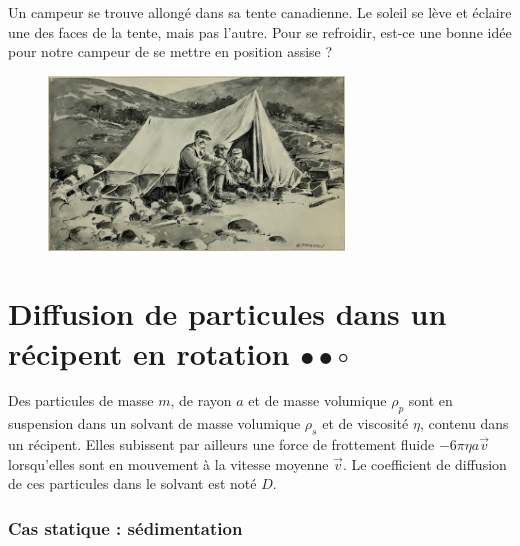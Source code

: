 \documentclass{report}
\begin{document}
Un campeur se trouve allongé dans sa tente canadienne. Le soleil se lève et éclaire une des faces de la tente, mais pas l'autre. Pour se refroidir, est-ce une bonne idée pour notre campeur de se mettre en position assise ? 
	
\vspace*{2cm}	
	
\begin{figure}[h!]
\centering
  \includegraphics[width=0.7\textwidth]{tente.jpg}
\end{figure}

\newpage	

\section*{Diffusion de particules dans un récipent en rotation $\bullet\bullet\circ$}

Des particules de masse $m$, de rayon $a$ et de masse volumique $\rho_p$ sont en suspension dans un solvant de masse volumique $\rho_s$ et de viscosité $\eta$, contenu dans un récipent. Elles subissent par ailleurs une force de frottement fluide $-6\pi\eta a\vec{v}$ lorsqu'elles sont en mouvement à la vitesse moyenne $\vec{v}$. Le coefficient de diffusion de ces particules dans le solvant est noté $D$.

\subsubsection*{Cas statique : sédimentation}
\end{document}
